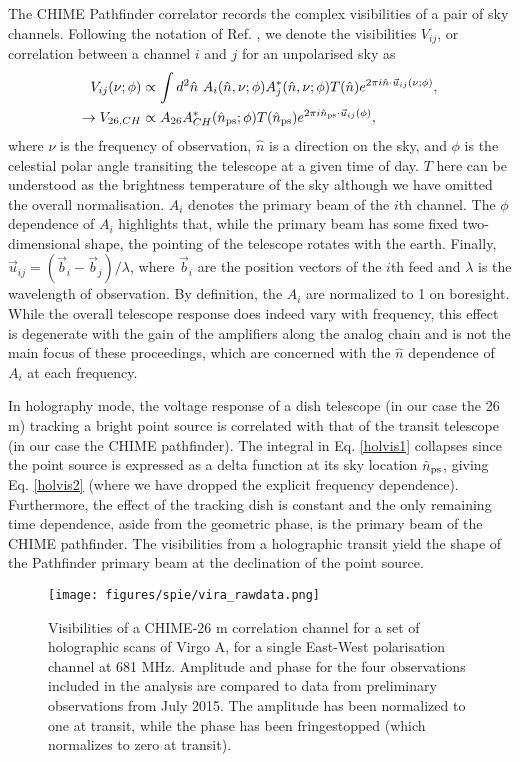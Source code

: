 The CHIME Pathfinder correlator records the complex visibilities of a pair of sky channels. Following the notation of Ref. \citep{mmodes1}, we denote the visibilities $V_{ij}$, or correlation between a channel $i$ and $j$ for an unpolarised sky as
\begin{align}
V_{ij}(\nu ; \phi) & \propto \int d^2\hat{n}~A_i(\hat{n}, \nu;\phi)A^*_j(\hat{n}, \nu;\phi) T(\hat{n}) e^{2\pi i \hat{n}\cdot\vec{u}_{ij}(\nu;\phi)},
\label{holvis1}
\\
\rightarrow V_{26,CH} & \propto A_{26}A^*_{CH}(\hat{n}_{\rm ps};\phi) T(\hat{n}_{\rm ps}) e^{2\pi i \hat{n}_{\rm ps}\cdot\vec{u}_{ij}(\phi)},
\label{holvis2}
\end{align}
where $\nu$ is the frequency of observation, $\hat{n}$ is a direction on the sky, and $\phi$ is the celestial polar angle transiting the telescope at a given time of day. $T$ here can be understood as the brightness temperature of the sky although we have omitted the overall normalisation. $A_i$ denotes the primary beam of the $i$th channel. The $\phi$ dependence of $A_i$ highlights that, while the primary beam has some fixed two-dimensional shape, the pointing of the telescope rotates with the earth. Finally, $\vec{u}_{ij}=(\vec{b}_i - \vec{b}_j)/ \lambda$, where $\vec{b}_i$ are the position vectors of the $i$th feed and $\lambda$ is the wavelength of observation. By definition, the $A_i$ are normalized to 1 on boresight. While the overall telescope response does indeed vary with frequency, this effect is degenerate with the gain of the amplifiers along the analog chain and is not the main focus of these proceedings, which are concerned with the $\hat{n}$ dependence of $A_i$ at each frequency. 

In holography mode, the voltage response of a dish telescope (in our case the 26 m) tracking a bright point source is correlated with that of the transit telescope (in our case the CHIME pathfinder). The integral in Eq. \ref{holvis1} collapses since the point source is expressed as a delta function at its sky location $\hat{n}_{\rm ps}$, giving Eq. \ref{holvis2} (where we have dropped the explicit frequency dependence). Furthermore, the effect of the tracking dish is constant and the only remaining time dependence, aside from the geometric phase, is the primary beam of the CHIME pathfinder. The visibilities from a holographic transit yield the shape of the Pathfinder primary beam at the declination of the point source.

\begin{figure}[h!]
\centering
\texttt{[image: figures/spie/vira\_rawdata.png]}
\caption{Visibilities of a CHIME-26 m correlation channel for a set of holographic scans of Virgo A, for a single East-West polarisation channel at 681 MHz. Amplitude and phase for the four observations included in the analysis are compared to data from preliminary observations from July 2015. The amplitude has been normalized to one at transit, while the phase has been fringestopped (which normalizes to zero at transit).}
\label{virraw}
\end{figure}

